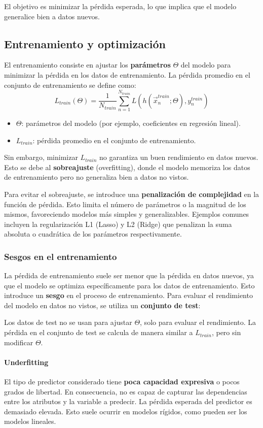 El objetivo es minimizar la pérdida esperada, lo que implica que el modelo generalice bien a datos nuevos.

\subsection{Entrenamiento y optimización}
El entrenamiento consiste en ajustar los \textbf{parámetros} $\Theta$ del modelo para minimizar la pérdida en los datos de entrenamiento. La pérdida promedio en el conjunto de entrenamiento se define como:
$$L_{train}(\Theta) = \frac{1}{N_{train}} \sum^{N_{train}}_{n=1} L(h(\vec{x}^{train}_n; \Theta), y^{train}_n)$$
\begin{itemize}
\item $\Theta$: parámetros del modelo (por ejemplo, coeficientes en regresión lineal).
\item $L_{train}$: pérdida promedio en el conjunto de entrenamiento.
\end{itemize}

Sin embargo, minimizar $L_{train}$ no garantiza un buen rendimiento en datos nuevos. Esto se debe al \textbf{sobreajuste} (overfitting), donde el modelo memoriza los datos de entrenamiento pero no generaliza bien a datos no vistos.

Para evitar el sobreajuste, se introduce una \textbf{penalización de complejidad} en la función de pérdida. Esto limita el número de parámetros o la magnitud de los mismos, favoreciendo modelos más simples y generalizables. Ejemplos comunes incluyen la regularización L1 (Lasso) y L2 (Ridge) que penalizan la suma absoluta o cuadrática de los parámetros respectivamente.

\subsubsection{Sesgos en el entrenamiento}
La pérdida de entrenamiento suele ser menor que la pérdida en datos nuevos, ya que el modelo se optimiza específicamente para los datos de entrenamiento. Esto introduce un \textbf{sesgo} en el proceso de entrenamiento. Para evaluar el rendimiento del modelo en datos no vistos, se utiliza un \textbf{conjunto de test}:

Los datos de test no se usan para ajustar $\Theta$, solo para evaluar el rendimiento. La pérdida en el conjunto de test se calcula de manera similar a $L_{train}$, pero sin modificar $\Theta$.

\paragraph{Underfitting}
El tipo de predictor considerado tiene \textbf{poca capacidad expresiva} o pocos grados de libertad. En consecuencia, no es capaz de capturar las dependencias entre los atributos y la variable a predecir. La pérdida esperada del predictor es demasiado elevada. Esto suele ocurrir en modelos rígidos, como pueden ser los modelos lineales.


